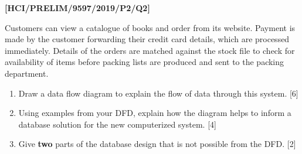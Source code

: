 \item \textbf{{[}HCI/PRELIM/9597/2019/P2/Q2{]} }

Customers can view a catalogue of books and order from its website.
Payment is made by the customer forwarding their credit card details,
which are processed immediately. Details of the orders are matched
against the stock file to check for availability of items before packing
lists are produced and sent to the packing department.
\begin{enumerate}
\item Draw a data flow diagram to explain the flow of data through this
system.\hfill{} {[}6{]}
\item Using examples from your DFD, explain how the diagram helps to inform
a database solution for the new computerized system.\hfill{} {[}4{]}
\item Give \textbf{two} parts of the database design that is not possible
from the DFD. \hfill{}{[}2{]}
\end{enumerate}